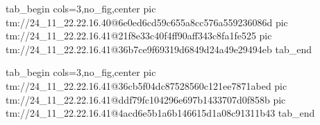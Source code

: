  
 
 
 
 

\qqSecCmtScr


\ifcmt
  tab_begin cols=3,no_fig,center
    pic tm://24_11_22.22.16.40@6e0ed6cd59c655a8cc576a559236086d
    pic tm://24_11_22.22.16.41@21f8e33c40f4ff90aff343c8fa1fe525
    pic tm://24_11_22.22.16.41@36b7ce9f69319d6849d24a49e29494eb
  tab_end
\fi


\ifcmt
  tab_begin cols=3,no_fig,center
    pic tm://24_11_22.22.16.41@36cb5f04dc87528560c121ee7871abed
    pic tm://24_11_22.22.16.41@ddf79fc104296e697b1433707d0f858b
    pic tm://24_11_22.22.16.41@4acd6e5b1a6b146615d1a08c91311b43
  tab_end
\fi

